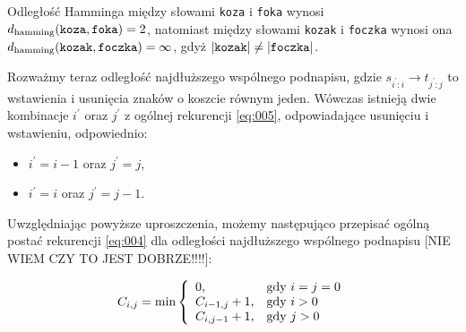 \documentclass{praca1}
\begin{document}
\begin{example}
Odległość Hamminga między słowami \verb|koza| i \verb|foka| wynosi $d_{\mathrm{hamming}}(\verb|koza|, \verb|foka|) = 2$, natomiast między słowami \verb|kozak| i \verb|foczka| wynosi ona $d_{\mathrm{hamming}}(\verb|kozak|, \verb|foczka|) = \infty$, gdyż $|\verb|kozak| | \neq | \verb|foczka| |$.
\end{example}




Rozważmy teraz odległość najdłuższego wspólnego podnapisu, gdzie $s_{i^\prime:i}\rightarrow t_{j^\prime:j}$ to wstawienia i usunięcia znaków o koszcie równym jeden. Wówczas istnieją dwie kombinacje $i^\prime$ oraz $j^\prime$ z ogólnej rekurencji \ref{eq:005}, odpowiadające usunięciu i wstawieniu, odpowiednio:
\begin{itemize}
\item $i^\prime = i - 1$ oraz $j^\prime = j$,
\item $i^\prime = i$ oraz $j^\prime = j - 1$.
\end{itemize}

Uwzględniając powyższe uproszczenia, możemy następująco przepisać ogólną postać rekurencji \ref{eq:004} dla odległości najdłuższego wspólnego podnapisu [NIE WIEM CZY TO JEST DOBRZE!!!!]:

\begin{equation*}
C_{i,j} = \min\left\{
\begin{array}{l l}     
    0, & \text{gdy } i = j = 0 \\
    C_{i-1, j} + 1, & \text{gdy } i > 0 \\
    C_{i, j-1} + 1, & \text{gdy } j > 0
\end{array}\right.
\end{equation*}


\end{document}

